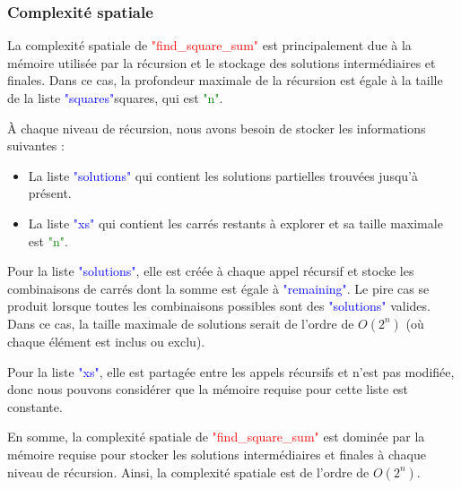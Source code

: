 \documentclass{article}
\begin{document}
\subsubsection{Complexité spatiale }
La complexité spatiale de \textcolor{red}{"find\_square\_sum"} est principalement due à la mémoire utilisée par la récursion et le stockage des solutions intermédiaires et finales. Dans ce cas, la profondeur maximale de la récursion est égale à la taille de la liste \textcolor{blue}{"squares"}squares, qui est \textcolor{green}{"n"}.\newline

À chaque niveau de récursion, nous avons besoin de stocker les informations suivantes :\newline

\begin{itemize}
  \item La liste \textcolor{blue}{"solutions"} qui contient les solutions partielles trouvées jusqu'à présent.
  \item La liste \textcolor{blue}{"xs"} qui contient les carrés restants à explorer et sa taille maximale est \textcolor{green}{"n"}.\newline
\end{itemize}

Pour la liste \textcolor{blue}{"solutions"}, elle est créée à chaque appel récursif et stocke les combinaisons de carrés dont la somme est égale à \textcolor{blue}{"remaining"}. Le pire cas se produit lorsque toutes les combinaisons possibles sont des \textcolor{blue}{"solutions"} valides. Dans ce cas, la taille maximale de solutions serait de l'ordre de $O(2^n)$ (où chaque élément est inclus ou exclu).\newline

Pour la liste \textcolor{blue}{"xs"}, elle est partagée entre les appels récursifs et n'est pas modifiée, donc nous pouvons considérer que la mémoire requise pour cette liste est constante.\newline

En somme, la complexité spatiale de \textcolor{red}{"find\_square\_sum"} est dominée par la mémoire requise pour stocker les solutions intermédiaires et finales à chaque niveau de récursion. Ainsi, la complexité spatiale est de l'ordre de $O(2^n)$.
\end{document}
